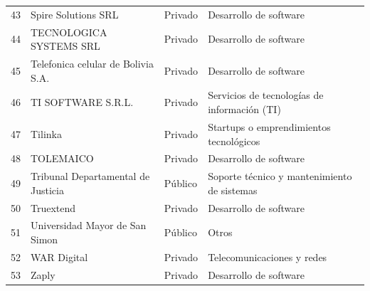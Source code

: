 {\begin{longtable}{rL{6.2cm}lL{4.6cm}}
43 & Spire Solutions SRL & Privado & Desarrollo de software \\
44 & TECNOLOGICA SYSTEMS SRL & Privado & Desarrollo de software \\
45 & Telefonica celular de Bolivia S.A. & Privado & Desarrollo de software \\
46 & TI SOFTWARE S.R.L. & Privado & Servicios de tecnologías de información (TI) \\
47 & Tilinka & Privado & Startups o emprendimientos tecnológicos \\
48 & TOLEMAICO & Privado & Desarrollo de software \\
49 & Tribunal Departamental de Justicia & Público & Soporte técnico y mantenimiento de sistemas \\
50 & Truextend & Privado & Desarrollo de software \\
51 & Universidad Mayor de San Simon & Público & Otros \\
52 & WAR Digital & Privado & Telecomunicaciones y redes \\
53 & Zaply & Privado & Desarrollo de software \\
\end{longtable}
}

